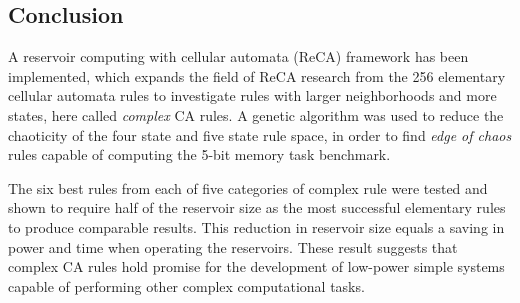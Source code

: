 \documentclass{elsarticle}
\begin{document}
\begin{multicols}{2}
	
	

	
        \section{Conclusion}\label{conclusion}
	A reservoir computing with cellular automata (ReCA) framework has been 
	implemented, which expands the field of ReCA research from the 256 elementary 
	cellular automata rules to investigate rules with larger neighborhoods and more 
	states, here called \textit{complex} CA rules. A genetic algorithm was used to 
	reduce the chaoticity of the four state and five state rule space, in order to 
	find \textit{edge of chaos} rules capable of computing the 5-bit memory task 
	benchmark. \par The six best rules from each of five categories of complex rule 
	were tested and shown to require half of the reservoir size as the most 
	successful elementary rules to produce comparable results. This reduction in 
	reservoir size equals a saving in power and time when operating the reservoirs.  
	These result suggests that complex CA rules hold promise for the development of 
	low-power simple systems capable of performing other complex computational 
	tasks.  
	

\end{multicols}
\end{document}
